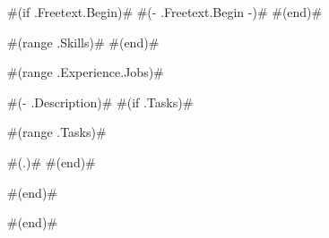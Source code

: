 \documentclass[8pt]{developercv} %
\begin{document}
\vspace{0.5cm}


\begin{minipage}[t]{0.4\textwidth} %
	\vspace{-\baselineskip} %
	
	#(if .Freetext.Begin)#
		#(- .Freetext.Begin -)#
	#(end)#

\end{minipage}
\hfill %
\begin{minipage}[t]{0.5\textwidth} %
	\vspace{-\baselineskip} %
	\begin{barchart}{5.5}
		#(range .Skills)#
		#(end)#
	\end{barchart}
\end{minipage}



\begin{entrylist}
	#(range .Experience.Jobs)#
	{ #(- .Description)# 
	#(if .Tasks)#\begin{compactitem}
		#(range .Tasks)# \item #(.)#
		#(end)#\end{compactitem}
	#(end)# }
#(end)#
\end{entrylist}

\end{document}

